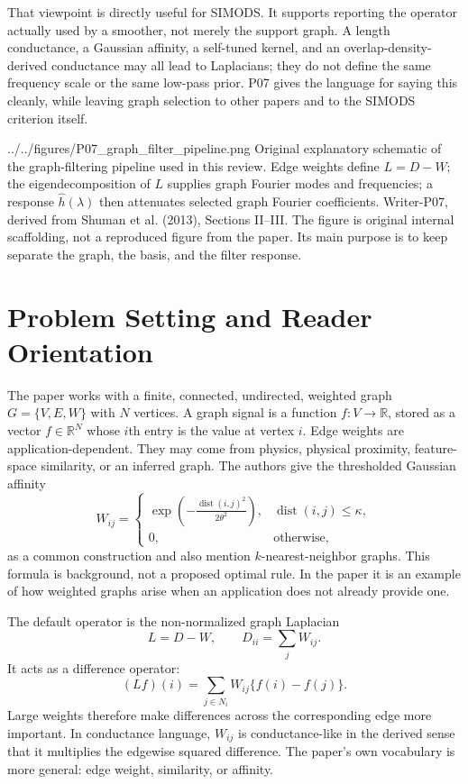 \documentclass[11pt]{article}
\begin{document}
That viewpoint is directly useful for SIMODS.  It supports reporting the
operator actually used by a smoother, not merely the support graph.  A length
conductance, a Gaussian affinity, a self-tuned kernel, and an
overlap-density-derived conductance may all lead to Laplacians; they do not
define the same frequency scale or the same low-pass prior.  P07 gives the
language for saying this cleanly, while leaving graph selection to other
papers and to the SIMODS criterion itself.

\paperfigure
  {../../figures/P07_graph_filter_pipeline.png}
  {Original explanatory schematic of the graph-filtering pipeline used in this
  review.  Edge weights define $L=D-W$; the eigendecomposition of $L$ supplies
  graph Fourier modes and frequencies; a response $\hat h(\lambda)$ then
  attenuates selected graph Fourier coefficients.}
  {Writer-P07, derived from Shuman et al. (2013), Sections II--III.}
  {The figure is original internal scaffolding, not a reproduced figure from
  the paper.  Its main purpose is to keep separate the graph, the basis, and
  the filter response.}

\section{Problem Setting and Reader Orientation}

The paper works with a finite, connected, undirected, weighted graph
$G=\{V,E,W\}$ with $N$ vertices.  A graph signal is a function
$f:V\to\mathbb{R}$, stored as a vector $f\in\mathbb{R}^N$ whose $i$th entry is
the value at vertex $i$.  Edge weights are application-dependent.  They may
come from physics, physical proximity, feature-space similarity, or an
inferred graph.  The authors give the thresholded Gaussian affinity
\[
  W_{ij}
  =
  \begin{cases}
    \exp\!\left(-\frac{\operatorname{dist}(i,j)^2}{2\theta^2}\right),
      & \operatorname{dist}(i,j)\leq \kappa,\\
    0, & \text{otherwise,}
  \end{cases}
\]
as a common construction and also mention $k$-nearest-neighbor graphs.  This
formula is background, not a proposed optimal rule.  In the paper it is an
example of how weighted graphs arise when an application does not already
provide one.

The default operator is the non-normalized graph Laplacian
\[
  L = D-W,\qquad D_{ii}=\sum_j W_{ij}.
\]
It acts as a difference operator:
\[
  (Lf)(i) = \sum_{j\in N_i} W_{ij}\{f(i)-f(j)\}.
\]
Large weights therefore make differences across the corresponding edge more
important.  In conductance language, $W_{ij}$ is conductance-like in the
derived sense that it multiplies the edgewise squared difference.  The paper's
own vocabulary is more general: edge weight, similarity, or affinity.
\end{document}
